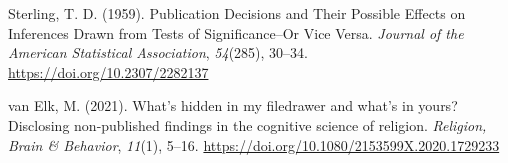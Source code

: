\documentclass[
  ,jou, a4paper,floatsintext]{apa6}
\newlength{\cslhangindent}
\newlength{\cslentryspacingunit} %
\newenvironment{CSLReferences}[2] %
 {%
  \setlength{\parindent}{0pt}
  \ifodd #1
  \let\oldpar\par
  \def\par{\hangindent=\cslhangindent\oldpar}
  \fi
  \setlength{\parskip}{#2\cslentryspacingunit}
 }%
 {}
\begin{document}
\begin{CSLReferences}{1}{0}
\leavevmode{}%
Sterling, T. D. (1959). Publication {Decisions} and {Their Possible Effects} on {Inferences Drawn} from {Tests} of {Significance--Or Vice Versa}. \emph{Journal of the American Statistical Association}, \emph{54}(285), 30--34. \url{https://doi.org/10.2307/2282137}

\leavevmode{}%
van Elk, M. (2021). What's hidden in my filedrawer and what's in yours? {Disclosing} non-published findings in the cognitive science of religion. \emph{Religion, Brain \& Behavior}, \emph{11}(1), 5--16. \url{https://doi.org/10.1080/2153599X.2020.1729233}

\end{CSLReferences}

\endgroup
\end{document}
